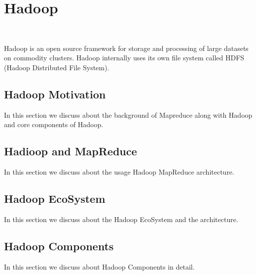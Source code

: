 
\chapter{Hadoop}
\label{c:hadoop}
\FILENAME\

Hadoop is an open source framework for storage and processing of large
datasets on commodity clusters. Hadoop internally uses its own file
system called HDFS (Hadoop Distributed File System).


\section{Hadoop Motivation}
\label{s:motivation-spark}

In this section we discuss about the background of Mapreduce along
with Hadoop and core components of Hadoop.



\section{Hadioop and MapReduce}

In this section we discuss about the usage Hadoop MapReduce
architecture.



\section{Hadoop EcoSystem}

In this section we discuss about the Hadoop EcoSystem and the
architecture.



\section{Hadoop Components}

In this section we discuss about Hadoop Components in detail.

